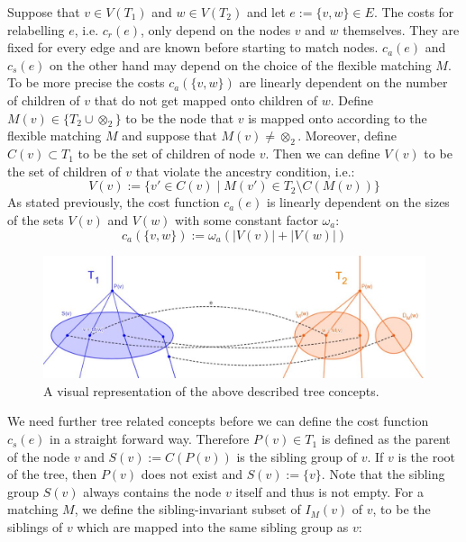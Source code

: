 Suppose that $v \in V(T_1)$ and $w \in V(T_2)$ and let $e:=\{v,w\}\in E$. The costs for relabelling $e$, i.e. $c_r(e)$, only depend on the nodes $v$ and $w$ themselves. They are fixed for every edge and are known before starting to match nodes. $c_a(e)$ and $c_s(e)$ on the other hand may depend on the choice of the flexible matching $M$. To be more precise the costs $c_a(\{v,w\})$ are linearly dependent on the number of children of $v$ that do not get mapped onto children of $w$. Define $M(v)\in \{T_2\cup\otimes_2\}$ to be the node that $v$ is mapped onto according to the flexible matching $M$ and suppose that $M(v) \neq \otimes_2$. Moreover, define $C(v) \subset T_1$ to be the set of children of node $v$. Then we can define $V(v)$ to be the set of children of $v$ that violate the ancestry condition, i.e.:
\begin{equation}
V(v) := \{v' \in C(v)\;|\;M(v') \in T_2 \setminus C(M(v))\}
\end{equation}
As stated previously, the cost function $c_a(e)$ is linearly dependent on the sizes of the sets $V(v)$ and $V(w)$ with some constant factor $\omega_a$:
\begin{equation}\label{eq:fted_ca}
c_a(\{v,w\}) := \omega_a (|V(v)| + |V(w)|)
\end{equation}
\begin{figure}[b!]
    \centering
        \includegraphics[width=\textwidth]{figures/Treeconcepts_flexible_tree_matching.png}
        \caption{A visual representation of the above described tree concepts.}
        \label{fig:treeConcepts}
\end{figure}
We need further tree related concepts before we can define the cost function $c_s(e)$ in a straight forward way. Therefore $P(v) \in T_1$ is defined as the parent of the node $v$ and $S(v):=C(P(v))$ is the sibling group of $v$. If $v$ is the root of the tree, then $P(v)$ does not exist and $S(v):=\{v\}$. Note that the sibling group $S(v)$ always contains the node $v$ itself and thus is not empty. For a matching $M$, we define the sibling-invariant subset of $I_M(v)$ of $v$, to be the siblings of $v$ which are mapped into the same sibling group as $v$:
